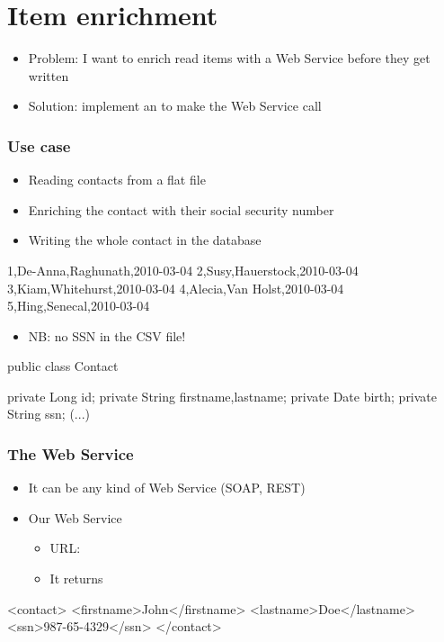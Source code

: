 \section{Item enrichment}

\begin{frame}
 \begin{itemize}
  \item Problem: I want to enrich read items with a Web Service before they get written
  \item Solution: implement an  to make the Web Service call
 \end{itemize}
\end{frame}

\begin{frame}
 \frametitle{Use case}
 \begin{itemize}
  \item Reading contacts from a flat file
  \item Enriching the contact with their social security number  
  \item Writing the whole contact in the database
 \end{itemize}
\end{frame}


\begin{frame}[fragile]
\begin{textcode}
1,De-Anna,Raghunath,2010-03-04
2,Susy,Hauerstock,2010-03-04
3,Kiam,Whitehurst,2010-03-04
4,Alecia,Van Holst,2010-03-04
5,Hing,Senecal,2010-03-04
\end{textcode}
\begin{itemize}
 \item NB: no SSN in the CSV file!
\end{itemize}
\begin{javacode}
public class Contact {

  private Long id;	
  private String firstname,lastname;	
  private Date birth;	
  private String ssn;
  (...)
}
\end{javacode}
\end{frame}

\begin{frame}[fragile]
\frametitle{The Web Service}
\begin{itemize}
 \item It can be any kind of Web Service (SOAP, REST)
 \item Our Web Service
 \begin{itemize}
    \item URL: 
    \item It returns
 \end{itemize} 
\end{itemize}

\begin{xmlcode}
<contact>
  <firstname>John</firstname>
  <lastname>Doe</lastname>
  <ssn>987-65-4329</ssn>
</contact>
\end{xmlcode}
\end{frame}

